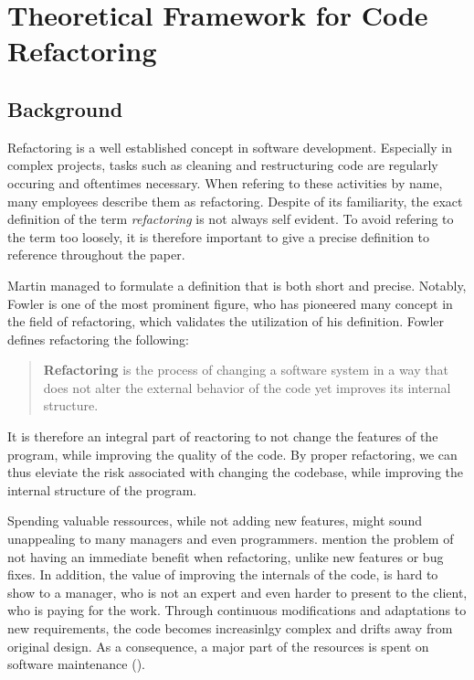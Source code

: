 \chapter{Theoretical Framework for Code Refactoring}

\section{Background}



Refactoring is a well established concept in software development. 
Especially in complex projects, 
	tasks such as cleaning and restructuring code are regularly occuring and oftentimes necessary. 
When refering to these activities by name, many employees describe them as refactoring. 
Despite of its familiarity, 
	the exact definition of the term \emph{refactoring} is not always self evident.
To avoid refering to the term too loosely, 
	it is therefore important to give a precise definition to reference throughout the paper. 

Martin \textcite[p. ~xiv]{fowler2018} managed to formulate a definition that is both short and precise. 
Notably, Fowler is one of the most prominent figure, 
	who has pioneered many concept in the field of refactoring,
	which validates the utilization of his definition.
Fowler defines refactoring the following:
\begin{quote}
\textbf{Refactoring} is the process of changing a software system in a way 
	that does not alter the external behavior of the code yet improves its internal structure.
\end{quote}

It is therefore an integral part of reactoring to not change the features of the program, 
	while improving the quality of the code.
By proper refactoring, we can thus eleviate the risk associated with changing the codebase,
	while improving the internal structure of the program.





Spending valuable ressources, while not adding new features, 
	might sound unappealing to many managers and even programmers.
\textcite[p.~1]{kim2012} mention the problem of not having an immediate benefit when refactoring, 
	unlike new features or bug fixes.
In addition, the value of improving the internals of the code, is hard to show to a manager, 
	who is not an expert and even harder to present to the client, who is paying for the work.
Through continuous modifications and adaptations to new requirements, the code becomes increasinlgy complex and drifts away from original design. 
As a consequence, 
	a major part of the resources is spent on software maintenance (\cite[p.~1]{mens2003}). 

